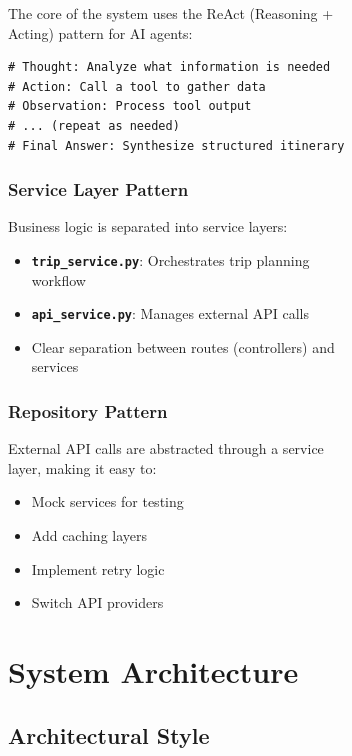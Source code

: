 \documentclass[12pt,a4paper]{report}
\newcommand{\file}[1]{\texttt{\textbf{#1}}}
\begin{document}
\begin{figure}[H]
\begin{plantuml}
\begin{figure}[H]
\begin{plantuml}
The core of the system uses the ReAct (Reasoning + Acting) pattern for AI agents:

\begin{lstlisting}[style=pythonstyle, caption={ReAct Pattern Flow}]
# Thought: Analyze what information is needed
# Action: Call a tool to gather data
# Observation: Process tool output
# ... (repeat as needed)
# Final Answer: Synthesize structured itinerary
\end{lstlisting}

\subsection{Service Layer Pattern}

Business logic is separated into service layers:
\begin{itemize}
    \item \file{trip\_service.py}: Orchestrates trip planning workflow
    \item \file{api\_service.py}: Manages external API calls
    \item Clear separation between routes (controllers) and services
\end{itemize}

\subsection{Repository Pattern}

External API calls are abstracted through a service layer, making it easy to:
\begin{itemize}
    \item Mock services for testing
    \item Add caching layers
    \item Implement retry logic
    \item Switch API providers
\end{itemize}


\chapter{System Architecture}

\section{Architectural Style}


\end{plantuml}
\end{figure}
\end{plantuml}
\end{figure}
\end{document}
